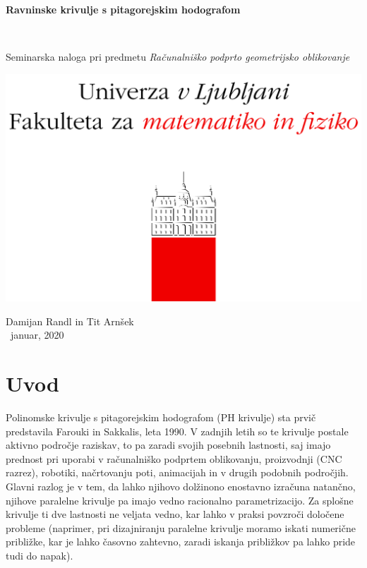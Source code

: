 \documentclass[12pt]{article}
\begin{document}
\thispagestyle{empty}
\begin{center}
\begin{Large}
{\bf Ravninske krivulje s pitagorejskim hodografom}
\end{Large}
\\[5mm]
\begin{large}
Seminarska naloga pri predmetu {\em Računalniško podprto geometrijsko oblikovanje }
\\[5mm]
\begin{center}
	\includegraphics{fmf.png}	
\end{center}
\vspace*{\fill}

{\sc Damijan Randl in Tit Arnšek}
\\[10mm]
~januar, 2020
\end{large}

\end{center}

\newpage
\tableofcontents
\newpage
\setcounter{page}{1}

\section{Uvod}
Polinomske krivulje s pitagorejskim hodografom (PH krivulje) sta prvič predstavila Farouki in Sakkalis, leta 1990.
V zadnjih letih so te krivulje postale aktivno področje raziskav,
to pa zaradi svojih posebnih lastnosti, 
saj imajo prednost pri uporabi v računalniško podprtem oblikovanju,
proizvodnji (CNC razrez), robotiki, načrtovanju poti, animacijah in v drugih 
podobnih področjih. Glavni razlog je v tem, da lahko njihovo dolžinono enostavno izračuna natančno,
njihove paralelne krivulje pa imajo vedno racionalno parametrizacijo.
\newline
Za splošne krivulje ti dve lastnosti ne veljata vedno, 
kar lahko v praksi povzroči določene probleme (naprimer, pri dizajniranju paralelne krivulje 
moramo iskati numerične približke, kar je lahko časovno zahtevno,
zaradi iskanja približkov pa lahko pride tudi do napak).
\end{document}
